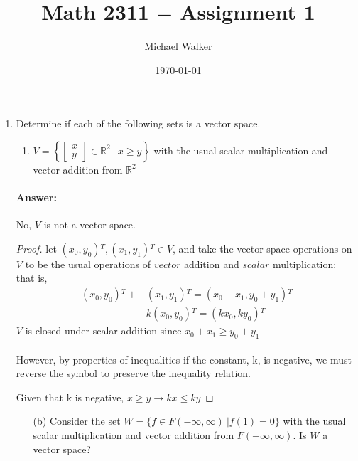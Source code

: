 \documentclass[12pt]{article}
\author{Michael Walker}
\title{Math 2311 $-$ Assignment 1}
\date{\today}
\newcommand{\DS} [1] {${\displaystyle #1}$}
\begin{document}
\maketitle
\begin{enumerate}
        \item
              Determine if each of the following sets is a vector space.
              \begin{enumerate}
                      \item $V=$\DS{ \left\{ \left[ \begin{array}{c}
                                                    x \\
                                                    y
                                            \end{array} \right] \in\mathbb{R}^2 \ | \ x \geq{y} \right\}}
                            with the usual scalar multiplication
                            and vector addition from $\mathbb{R}^2$
              \end{enumerate}
              \paragraph{Answer:} No, $V$ is not a vector space.
              \begin{proof}
                      let $({x_0}, {y_0}){^T}, ({x_1}, {y_1}){^T} \in V$,
                      and take the vector space operations on $V$
                      to be the usual operations of $vector$
                      addition and $scalar$ multiplication; that is,
                      \begin{align}
                              ({x_0}, {y_0}){^T}+ & ({x_1}, {y_1}){^T} =({x_0}+{x_1}, {y_0}+{y_1}){^T} \\
                                                  & k({x_0}, {y_0}){^T} = ({kx_0}, {ky_0}){^T}
                      \end{align}
                      $V$ is closed under scalar addition since ${x_0 + x_1} \ge {y_0 + y_1}$ \\\\
                      However, by properties of inequalities if the constant,
                      k, is negative, we must reverse the symbol to preserve the inequality relation.

                      Given that k is negative, ${x\geq y} \rightarrow {kx\leq ky}$
              \end{proof}
              \begin{enumerate}
                      \item[(b)] Consider the set $W = \{f \in F(-\infty, \infty) \ | f(1) = 0\}$
                            with the usual scalar multiplication and vector addition from
                            $F(-\infty, \infty)$.
                            Is $W$ a vector space?
              \end{enumerate}

\end{enumerate}
\end{document}
